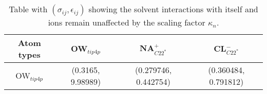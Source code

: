 \begin{table}[h!]
    \centering
    \caption{Table with $(\sigma_{ij}, \epsilon_{ij})$ showing the solvent interactions with itself and ions remain unaffected by the scaling factor $\kappa_{n}$.}
    \begin{tabular}{c | c c c }

    Atom types & OW$_{tip4p}$ & NA$^{+}_{C22^{*}}$ & CL$^{-}_{C22^{*}}$ \\
    \hline
    OW$_{tip4p}$ & (0.3165, 9.98989) & (0.279746, 0.442754)  & (0.360484, 0.791812)\\
    
    \hline
    \end{tabular}
    
    \label{tab:eps_noscale_table}
\end{table}